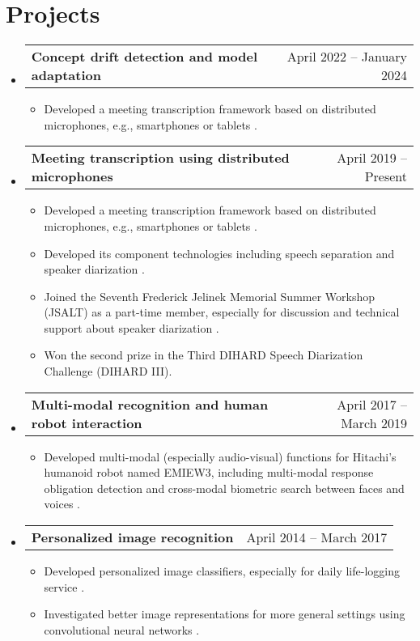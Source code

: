 \documentclass[letterpaper,11pt]{article}
\makeatletter
\newcommand{\resumeItem}[1]{
  \item\small{
    {#1 \vspace{-2pt}}
  }
}
\newcommand{\resumeProjectHeading}[2]{
    \item
    \begin{tabular*}{0.97\textwidth}{l@{\extracolsep{\fill}}r}
      \small#1 & #2 \\
    \end{tabular*}\vspace{-7pt}
}
\newcommand{\resumeSubHeadingListStart}{\begin{itemize}[leftmargin=0.15in, label={}]}
\newcommand{\resumeSubHeadingListEnd}{\end{itemize}}
\newcommand{\resumeItemListStart}{\begin{itemize}}
\newcommand{\resumeItemListEnd}{\end{itemize}\vspace{-5pt}}
\makeatother
\begin{document}
\section{Projects}
    \resumeSubHeadingListStart
      \resumeProjectHeading
          {\textbf{Concept drift detection and model adaptation}}{April 2022 -- January 2024}
          \resumeItemListStart
            \resumeItem{Developed a meeting transcription framework based on distributed microphones, e.g., smartphones or tablets \cite{horiguchi2020utterancewise}.}
          \resumeItemListEnd
      \resumeProjectHeading
          {\textbf{Meeting transcription using distributed microphones}}{April 2019 -- Present}
          \resumeItemListStart
            \resumeItem{Developed a meeting transcription framework based on distributed microphones, e.g., smartphones or tablets \cite{horiguchi2020utterancewise}.}
            \resumeItem{Developed its component technologies including speech separation \cite{horiguchi2021blockonline} and speaker diarization \cite{horiguchi2022multichannel,horiguchi2021towards,horiguchi2020endtoend,horiguchi2021endtoend}.}
            \resumeItem{Joined the Seventh Frederick Jelinek Memorial Summer Workshop (JSALT) as a part-time member, especially for discussion and technical support about speaker diarization \cite{horiguchi2021endtoend}.}
            \resumeItem{Won the second prize in the Third DIHARD Speech Diarization Challenge (DIHARD III).}
          \resumeItemListEnd
      \resumeProjectHeading
          {\textbf{Multi-modal recognition and human robot interaction}}{April 2017 -- March 2019}
          \resumeItemListStart
            \resumeItem{Developed multi-modal (especially audio-visual) functions for Hitachi's humanoid robot named EMIEW3, including multi-modal response obligation detection \cite{horiguchi2019multimodal} and cross-modal biometric search between faces and voices \cite{horiguchi2018facevoice}.}
          \resumeItemListEnd
      \resumeProjectHeading
          {\textbf{Personalized image recognition}}{April 2014 -- March 2017}
          \resumeItemListStart
            \resumeItem{Developed personalized image classifiers, especially for daily life-logging service \cite{horiguchi2018personalized}.}
            \resumeItem{Investigated better image representations for more general settings using convolutional neural networks \cite{horiguchi2020significance}.}
          \resumeItemListEnd
    \resumeSubHeadingListEnd
\end{document}
